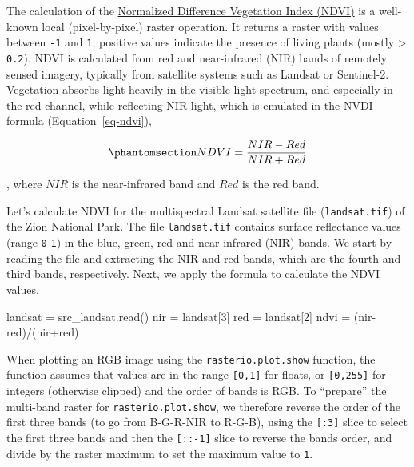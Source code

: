 \documentclass[
  letterpaper,
]{krantz}
\newenvironment{Shaded}{\begin{snugshade}}{\end{snugshade}}
\newcommand{\DecValTok}[1]{\textcolor[rgb]{0.68,0.00,0.00}{#1}}
\newcommand{\NormalTok}[1]{\textcolor[rgb]{0.00,0.23,0.31}{#1}}
\newcommand{\OperatorTok}[1]{\textcolor[rgb]{0.37,0.37,0.37}{#1}}
\begin{document}
The calculation of the
\href{https://en.wikipedia.org/wiki/Normalized_difference_vegetation_index}{Normalized
Difference Vegetation Index (NDVI)} is a well-known local
(pixel-by-pixel) raster operation. It returns a raster with values
between \texttt{-1} and \texttt{1}; positive values indicate the
presence of living plants (mostly \textgreater{} \texttt{0.2}). NDVI is
calculated from red and near-infrared (NIR) bands of remotely sensed
imagery, typically from satellite systems such as Landsat or Sentinel-2.
Vegetation absorbs light heavily in the visible light spectrum, and
especially in the red channel, while reflecting NIR light, which is
emulated in the NVDI formula (Equation~\ref{eq-ndvi}),

\begin{equation}\phantomsection\label{eq-ndvi}{
NDVI=\frac{NIR-Red} {NIR+Red}
}\end{equation}

, where \(NIR\) is the near-infrared band and \(Red\) is the red band.

Let's calculate NDVI for the multispectral Landsat satellite file
(\texttt{landsat.tif}) of the Zion National Park. The file
\texttt{landsat.tif} contains surface reflectance values (range
\texttt{0}-\texttt{1}) in the blue, green, red and near-infrared (NIR)
bands. We start by reading the file and extracting the NIR and red
bands, which are the fourth and third bands, respectively. Next, we
apply the formula to calculate the NDVI values.

\begin{Shaded}
\begin{Highlighting}[]
\NormalTok{landsat }\OperatorTok{=}\NormalTok{ src\_landsat.read()}
\NormalTok{nir }\OperatorTok{=}\NormalTok{ landsat[}\DecValTok{3}\NormalTok{]}
\NormalTok{red }\OperatorTok{=}\NormalTok{ landsat[}\DecValTok{2}\NormalTok{]}
\NormalTok{ndvi }\OperatorTok{=}\NormalTok{ (nir}\OperatorTok{{-}}\NormalTok{red)}\OperatorTok{/}\NormalTok{(nir}\OperatorTok{+}\NormalTok{red)}
\end{Highlighting}
\end{Shaded}

When plotting an RGB image using the \texttt{rasterio.plot.show}
function, the function assumes that values are in the range
\texttt{{[}0,1{]}} for floats, or \texttt{{[}0,255{]}} for integers
(otherwise clipped) and the order of bands is RGB. To ``prepare'' the
multi-band raster for \texttt{rasterio.plot.show}, we therefore reverse
the order of the first three bands (to go from B-G-R-NIR to R-G-B),
using the \texttt{{[}:3{]}} slice to select the first three bands and
then the \texttt{{[}::-1{]}} slice to reverse the bands order, and
divide by the raster maximum to set the maximum value to \texttt{1}.
\end{document}
